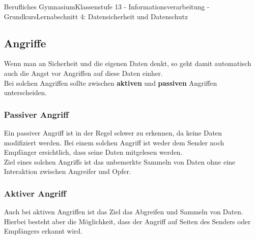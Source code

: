 \documentclass[11pt,oneside,openany,headings=optiontotoc,11pt,numbers=noenddot]{article}
\begin{document}
\begin{worksheet}{Berufliches Gymnasium}{Klassenstufe 13 - Informationsverarbeitung - Grundkurs}{Lernabschnitt 4: Datensicherheit und Datenschutz}
		\subsection{Angriffe}
		Wenn man an Sicherheit und die eigenen Daten denkt, so geht damit automatisch auch die Angst vor Angriffen auf diese Daten einher.\\
		Bei solchen Angriffen sollte zwischen \textbf{aktiven} und \textbf{passiven} Angriffen unterscheiden.
		\subsubsection{Passiver Angriff}
		Ein passiver Angriff ist in der Regel schwer zu erkennen, da keine Daten modifiziert werden. Bei einem solchen Angriff ist weder dem Sender noch Empfänger ersichtlich, dass seine Daten mitgelesen werden.\\
		Ziel eines solchen Angriffs ist das unbemerkte Sammeln von Daten ohne eine Interaktion zwischen Angreifer und Opfer.
		\subsubsection{Aktiver Angriff}
		Auch bei aktiven Angriffen ist das Ziel das Abgreifen und Sammeln von Daten. Hierbei besteht aber die Möglichkeit, dass der Angriff auf Seiten des Senders oder Empfängers erkannt wird.

\end{worksheet}
\end{document}

